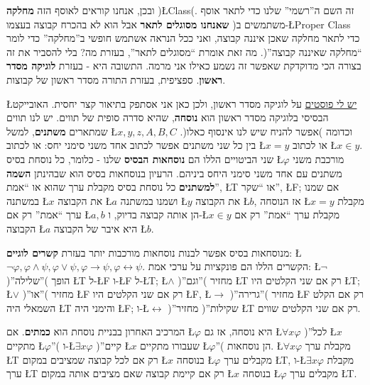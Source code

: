 \documentclass[english,hebrew]{article}
\begin{document}
ובכן, אנחנו קוראים לאוסף הזה \textbf{מחלקה} )\L{Class}(. זה השם ה\textquotedblright רשמי\textquotedblright{}
שלנו כדי לתאר אוסף \textbf{שאנחנו מסוגלים לתאר} אבל הוא לא בהכרח קבוצה
בעצמו )משתמשים ב-\L{Proper Class} כדי לתאר מחלקה שאכן איננה קבוצה,
ואני ככל הנראה אשתמש חופשי ב\textquotedblright מחלקה\textquotedblright{}
כדי לומר \textquotedblleft מחלקה שאיננה קבוצה\textquotedblright (.
מה זאת אומרת \textquotedblleft מסוגלים לתאר\textquotedblright , בעזרת
מה? בלי להסביר את זה בצורה הכי מדוקדקת שאפשר זה נשמע כאילו אני מרמה.
התשובה היא - בעזרת \textbf{לוגיקה מסדר ראשון}. ספציפית, בעזרת התורה
מסדר ראשון של קבוצות.

\L{\href{https://gadial.net/2012/06/17/first_order_logic/}{יש לי פוסטים}}
על לוגיקה מסדר ראשון, ולכן כאן אני אסתפק בתיאור קצר יחסית. האובייקט
הבסיסי בלוגיקה מסדר ראשון הוא \textbf{נוסחה}, שהיא סדרה סופית של תווים.
יש לנו תווים שמתארים \textbf{משתנים}, למשל \L{$x,y,z,A,B,C$} וכדומה
)אפשר להניח שיש לנו אינסוף כאלו(. בין כל שני משתנים אפשר לכתוב אחד
משני סימני יחס: או לכתוב \L{$x=y$} או לכתוב \L{$x\in y$}. שני הביטויים
הללו הם \textbf{נוסחאות הבסיס} שלנו - כלומר, כל נוסחת בסיס \L{$\varphi$}
מורכבת משני משתנים עם אחד משני סימני היחס ביניהם. הרעיון בנוסחאות
בסיס הוא שבהינתן \textbf{השמה למשתנים} כל נוסחת בסיס מקבלת ערך שהוא
או \textquotedblleft אמת\textquotedblright , \L{T} או \textquotedblleft שקר\textquotedblright ,
\L{F}; אם שמנו במשתנה \L{$x$} את הקבוצה \L{$a$} ושמנו במשתנה \L{$y$}
את הקבוצה \L{$b$}, אז הנוסחה \L{$x=y$} מקבלת ערך \textquotedblleft אמת\textquotedblright{}
רק אם \L{$a,b$} הן אותה קבוצה בדיוק, ו-\L{$x\in y$} מקבלת ערך \textquotedblleft אמת\textquotedblright{}
רק אם הקבוצה \L{$a$} היא איבר של הקבוצה \L{$b$}.

מנוסחאות בסיס אפשר לבנות נוסחאות מורכבות יותר בעזרת \textbf{קשרים
לוגיים}: \L{$\neg\varphi,\varphi\wedge\psi,\varphi\vee\psi,\varphi\to\psi,\varphi\leftrightarrow\psi$}.
הקשרים הללו הם פונקציות על ערכי אמת: \L{$\neg$} )\textquotedblright שלילה\textquotedblright (
הופך \L{T} ל-\L{F} ו-\L{F} ל-\L{T}; \L{$\wedge$} )\textquotedblright וגם\textquotedblright (
מחזיר \L{T} רק אם שני הקלטים היו \L{T}; \L{$\vee$} )\textquotedblright או\textquotedblright (
מחזיר \L{F} רק אם שני הקלטים היו \L{F}, \L{$\to$} )\textquotedblright גרירה\textquotedblright (
מחזיר \L{F} רק אם הקלט השמאלי היה \L{T} והימני היה \L{F}; ו-\L{$\leftrightarrow$}
)\textquotedblright שקילות\textquotedblright ( מחזיר \L{T} רק אם שני
הקלטים שווים.

המרכיב האחרון בבניית נוסחת הוא \textbf{כמתים}. אם \L{$\varphi$} היא
נוסחה, אז גם \L{$\forall x\varphi$} )\textquotedblright לכל \L{$x$}
מתקיים \L{$\varphi$}\textquotedblright ( ו-\L{$\exists x\varphi$}
)\textquotedblright קיים \L{$x$} שעבורו מתקיים \L{$\varphi$}\textquotedblright (
הן נוסחאות. \L{$\forall x\varphi$} מקבלת ערך \L{T} רק אם לכל קבוצה
שמציבים במקום \L{$x$} בנוסחה \L{$\varphi$} מקבלים ערך \L{T}, ו-\L{$\exists x\varphi$}
מקבלת ערך \L{T} רק אם קיימת קבוצה שאם מציבים אותה במקום \L{$x$} בנוסחה
\L{$\varphi$} מקבלים ערך \L{T}.
\end{document}
